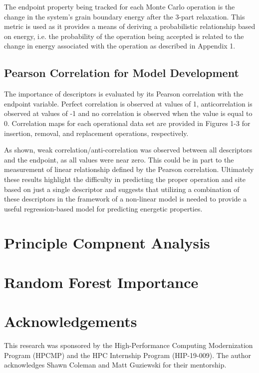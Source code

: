 \documentclass[aip,reprint,longbibliography,amsmath,amssymb,twocolumn,superscriptaddress]{revtex4-1}
\begin{document}
The endpoint property being tracked for each Monte Carlo operation is the change in the system’s grain boundary energy after the 3-part relaxation. 
%
This metric is used as it provides a means of deriving a probabilistic relationship based on energy, i.e. the probability of the operation being accepted is related to the change in energy associated with the operation as described in Appendix 1. 

\subsection{Pearson Correlation for Model Development}

The importance of descriptors is evaluated by its Pearson correlation with the endpoint variable. Perfect correlation is observed at values of 1, anticorrelation is observed at values of -1 and no correlation is observed when the value is equal to 0. 
%
Correlation maps for each operational data set are provided in Figures 1-3 for insertion, removal, and replacement operations, respectively.  


As shown, weak correlation/anti-correlation was observed between all descriptors and the endpoint, as all values were near zero.  
%
This could be in part to the measurement of linear relationship defined by the Pearson correlation.  
%
Ultimately these results highlight the difficulty in predicting the proper operation and site based on just a single descriptor and suggests that utilizing a combination of these descriptors in the framework of a non-linear model is needed to provide a useful regression-based model for predicting energetic properties. 

\section{Principle Compnent Analysis}

\section{Random Forest Importance}

\section{Acknowledgements}
This research was sponsored by the High-Performance Computing Modernization Program (HPCMP) and the HPC Internship Program (HIP-19-009). 
%
The author acknowledges Shawn Coleman and Matt Guziewski for their mentorship.
\end{document}
